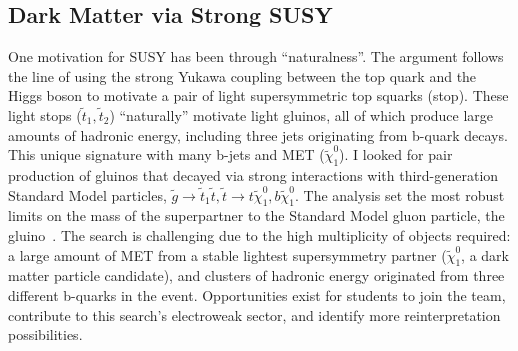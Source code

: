 \documentclass[10pt,a4paper,sans]{moderncv} %
\begin{document}
\subsection{Dark Matter via Strong SUSY}
One motivation for SUSY has been through ``naturalness''. The argument follows the line of using the strong Yukawa coupling between the top quark and the Higgs boson to motivate a pair of light supersymmetric top squarks (stop). These light stops ($\tilde{t}_1, \tilde{t}_2$) ``naturally'' motivate light gluinos, all of which produce large amounts of hadronic energy, including three jets originating from b-quark decays. This unique signature with many b-jets and MET ($\tilde{\chi}_1^0$). I looked for pair production of gluinos that decayed via strong interactions with third-generation Standard Model particles, $\tilde{g} \to \tilde{t}_1 \tilde{t},  \tilde{t} \to t\tilde{\chi}_1^0, b\tilde{\chi}_1^0$. The analysis set the most robust limits on the mass of the superpartner to the Standard Model gluon particle, the gluino~\cite{SUSY-2016-10, SUSY-2015-10}.  The search is challenging due to the high multiplicity of objects required: a large amount of MET from a stable lightest supersymmetry partner ($\tilde{\chi}_1^0$, a dark matter particle candidate), and clusters of hadronic energy originated from three different b-quarks in the event. Opportunities exist for students to join the team, contribute to this search's electroweak sector, and identify more reinterpretation possibilities.
\end{document}
